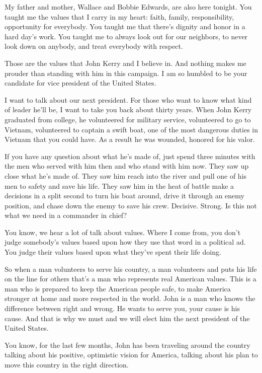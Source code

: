 My father and mother, Wallace and Bobbie Edwards, are also here tonight.
You taught me the values that I carry in my heart: faith, family,
responsibility, opportunity for everybody. You taught me that there's
dignity and honor in a hard day's work. You taught me to always look out
for our neighbors, to never look down on anybody, and treat everybody
with respect.

Those are the values that John Kerry and I believe in. And nothing makes
me prouder than standing with him in this campaign. I am so humbled to
be your candidate for vice president of the United States.

I want to talk about our next president. For those who want to know what
kind of leader he'll be, I want to take you back about thirty years.
When John Kerry graduated from college, he volunteered for military
service, volunteered to go to Vietnam, volunteered to captain a swift
boat, one of the most dangerous duties in Vietnam that you could have.
As a result he was wounded, honored for his valor.

If you have any question about what he's made of, just spend three
minutes with the men who served with him then and who stand with him
now. They saw up close what he's made of. They saw him reach into the
river and pull one of his men to safety and save his life. They saw him
in the heat of battle make a decisions in a split second to turn his
boat around, drive it through an enemy position, and chase down the
enemy to save his crew. Decisive. Strong. Is this not what we need in a
commander in chief?

You know, we hear a lot of talk about values. Where I come from, you
don't judge somebody's values based upon how they use that word in a
political ad. You judge their values based upon what they've spent their
life doing.

So when a man volunteers to serve his country, a man volunteers and puts
his life on the line for others that's a man who represents real
American values. This is a man who is prepared to keep the American
people safe, to make America stronger at home and more respected in the
world. John is a man who knows the difference between right and wrong.
He wants to serve you, your cause is his cause. And that is why we must
and we will elect him the next president of the United States.

You know, for the last few months, John has been traveling around the
country talking about his positive, optimistic vision for America,
talking about his plan to move this country in the right direction.

